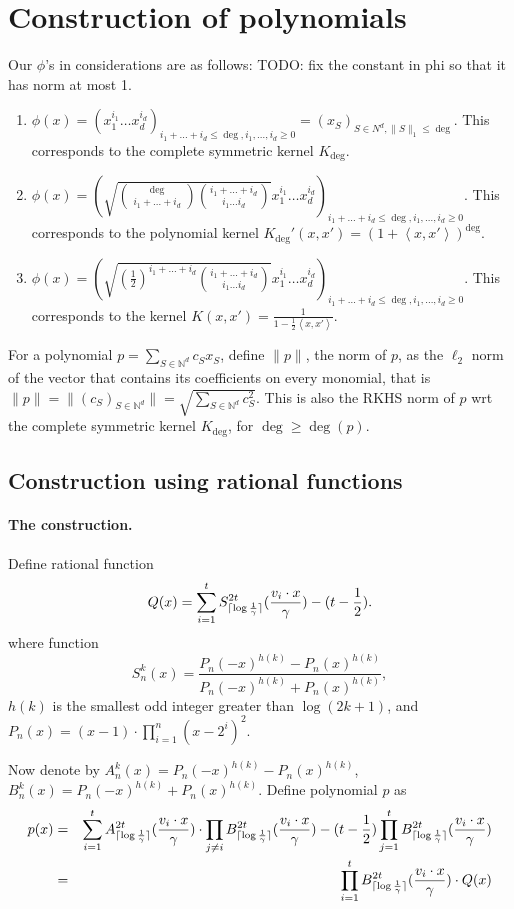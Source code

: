 \documentclass{article}
\DeclarePairedDelimiter\ceil{\lceil}{\rceil}
\newcommand{\field}[1]{\mathbb{#1}}
\newcommand{\fN}{\field{N}}
\newcommand{\inner}[1]{ \left\langle {#1} \right\rangle }
\begin{document}
\section{Construction of polynomials}
Our $\phi$'s in considerations are as follows: TODO: fix the constant in phi so that it has norm at most 1.
\begin{enumerate}
\item $\phi(x) = (x_1^{i_1} \ldots x_d^{i_d})_{i_1 + \ldots + i_d \leq \deg, i_1, \ldots, i_d \geq 0} = (x_S)_{S \in N^d, \|S\|_1 \leq \deg}$. This corresponds to the complete symmetric kernel $K_{\deg}$.
\item $\phi(x) = ( \sqrt{ {\deg \choose i_1+\ldots+i_d} {i_1+\ldots+i_d \choose i_1 \ldots i_d}}  x_1^{i_1} \ldots x_d^{i_d})_{i_1 + \ldots + i_d \leq \deg, i_1, \ldots, i_d \geq 0}$. This corresponds to the polynomial kernel
$K_{\deg}'(x,x') = (1 + \inner{x, x'})^{\deg}$.
\item $\phi(x) = ( \sqrt{ (\frac 1 2)^{i_1+\ldots+i_d} {i_1+\ldots+i_d \choose i_1 \ldots i_d}}  x_1^{i_1} \ldots x_d^{i_d})_{i_1 + \ldots + i_d \leq \deg, i_1, \ldots, i_d \geq 0}$. This corresponds to the kernel $K(x,x') = \frac{1}{1 - \frac 1 2 \inner{x,x'}}$.
\end{enumerate}

For a polynomial $p = \sum_{S \in \fN^d} c_S x_S$, define $\|p\|$, the norm of $p$, as the $\ell_2$ norm of the vector that contains its coefficients on every monomial, that is $\|p\| = \| (c_S)_{S \in \fN^d} \| = \sqrt{\sum_{S \in \fN^d} c_S^2}$. This is also the RKHS norm of $p$ wrt the complete symmetric kernel $K_{\deg}$, for $\deg \geq \deg(p)$.



\subsection{Construction using rational functions}
\paragraph{The construction.} Define rational function
\[
  Q(x) = \sum_{i=1}^t S_{\ceil{\log \frac 1 \gamma}}^{2t}(\frac{v_i \cdot x}{\gamma}) - (t - \frac 1 2).
\]
where function
\[
S_n^k(x) = \frac{P_n(-x)^{h(k)} - P_n(x)^{h(k)}}{P_n(-x)^{h(k)} + P_n(x)^{h(k)}},
\]
$h(k)$ is the smallest odd integer greater than $\log(2k+1)$, and $P_n(x) = (x - 1) \cdot \prod_{i=1}^n (x - 2^i)^2$.

Now denote by $A_n^k(x) = P_n(-x)^{h(k)} - P_n(x)^{h(k)}$, $B_n^k(x) = P_n(-x)^{h(k)} + P_n(x)^{h(k)}$. Define  polynomial $p$ as
\begin{eqnarray*}
  p(x) &=& \sum_{i=1}^t A_{\ceil{\log \frac 1 \gamma}}^{2t}(\frac{v_i \cdot x}{\gamma}) \cdot \prod_{j \neq i} B_{\ceil{\log \frac 1 \gamma}}^{2t}(\frac{v_i \cdot x}{\gamma}) - (t-\frac12) \prod_{j=1}^t B_{\ceil{\log \frac 1 \gamma}}^{2t}(\frac{v_i \cdot x}{\gamma}) \\
  &=& \prod_{i=1}^t B_{\ceil{\log \frac 1 \gamma}}^{2t}(\frac{v_i \cdot x}\gamma) \cdot Q(x)
\end{eqnarray*}
\end{document}
